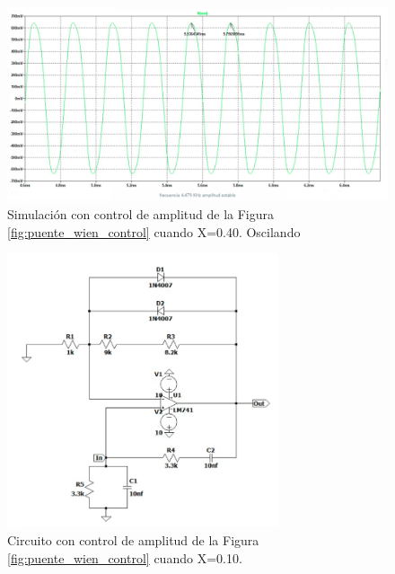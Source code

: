 \begin{enumerate}
\begin{itemize}
                    \begin{figure}[H]
                        \centering
                        \renewcommand{\figurename}{Gráfica}
                        \setcounter{figure}{6}
                        \includegraphics[width=15cm]{Imagenes/sim_puente_wien_control45.png}
                        \caption{Simulación con control de amplitud de la Figura \ref{fig:puente_wien_control} cuando X=0.40. Oscilando}
                        \label{fig:sim_puente_wien_control45}
                    \end{figure}
                    
                    
                    
                     \begin{figure}[H]
                        \centering
                        \setcounter{figure}{11}
                        \includegraphics[width=8cm]{Imagenes/sim_cir_puente_wien_control9.png}
                        \caption{Circuito con control de amplitud de la Figura \ref{fig:puente_wien_control} cuando X=0.10.}
                        \label{fig:sim_cir_puente_wien_control9}
                    \end{figure}


\end{itemize}
\end{enumerate}

